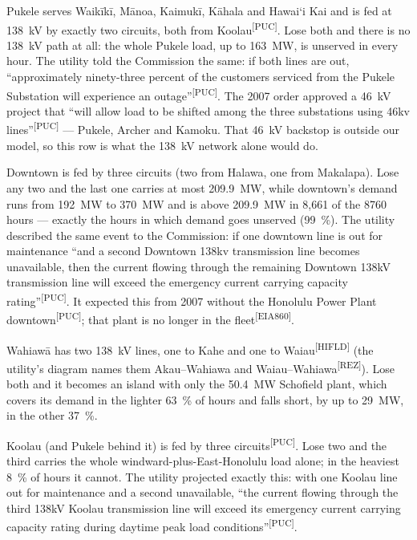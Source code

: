 \documentclass[11pt,a4paper]{article}
\newcommand{\okina}{\textquoteleft}
\newcommand{\src}[1]{\textsuperscript{[#1]}}
\begin{document}
\begin{description}[leftmargin=1.2em,style=nextline]
  \item[East Honolulu (Pukele) --- the largest single exposure.] Pukele serves
        Waik\=ik\=i, M\=anoa, Kaimuk\=i, K\=ahala and Hawai\okina i Kai and is fed at
        \SI{138}{kV} by exactly two circuits, both from Koolau\src{PUC}. Lose both and
        there is no \SI{138}{kV} path at all: the whole Pukele load, up to
        \SI{163}{MW}, is unserved in every hour. The utility told the Commission the
        same: if both lines are out, ``approximately ninety-three percent of the
        customers serviced from the Pukele Substation will experience an
        outage''\src{PUC}. The 2007 order approved a \SI{46}{kV} project that ``will
        allow load to be shifted among the three substations using 46kv
        lines''\src{PUC} --- Pukele, Archer and Kamoku. That \SI{46}{kV} backstop is
        outside our model, so this row is what the \SI{138}{kV} network alone would do.
  \item[Downtown Honolulu --- the utility's own ``Downtown Overload Situation''.]
        Downtown is fed by three circuits (two from Halawa, one from Makalapa). Lose any
        two and the last one carries at most \SI{209.9}{MW}, while downtown's demand runs
        from \SI{192}{MW} to \SI{370}{MW} and is above \SI{209.9}{MW} in 8,661 of the
        \num{8760} hours --- exactly the hours in which demand goes unserved
        (\SI{99}{\percent}).
        The utility described the same event to the Commission: if one downtown line is
        out for maintenance ``and a second Downtown 138kv transmission line becomes
        unavailable, then the current flowing through the remaining Downtown 138kV
        transmission line will exceed the emergency current carrying capacity
        rating''\src{PUC}. It expected this from 2007 without the Honolulu Power Plant
        downtown\src{PUC}; that plant is no longer in the fleet\src{EIA860}.
  \item[Wahiaw\=a and the North Shore.] Wahiaw\=a has two \SI{138}{kV} lines, one to
        Kahe and one to Waiau\src{HIFLD} (the utility's diagram names them Akau--Wahiawa
        and Waiau--Wahiawa\src{REZ}). Lose both and it becomes an island with only the
        \SI{50.4}{MW} Schofield plant, which covers its demand in the lighter
        \SI{63}{\percent} of hours and falls short, by up to \SI{29}{MW}, in the other
        \SI{37}{\percent}.
  \item[The windward side and East Honolulu together.] Koolau (and Pukele behind it) is
        fed by three circuits\src{PUC}. Lose two and the third carries the whole
        windward-plus-East-Honolulu load alone; in the heaviest \SI{8}{\percent} of
        hours it cannot. The utility projected exactly this: with one Koolau line out for
        maintenance and a second unavailable, ``the current flowing through the third
        138kV Koolau transmission line will exceed its emergency current carrying
        capacity rating during daytime peak load conditions''\src{PUC}.
\end{description}
\end{document}
